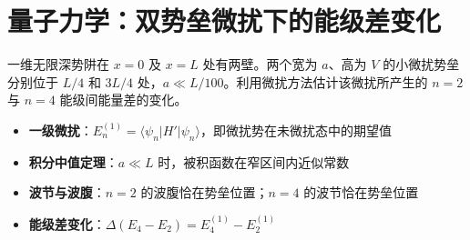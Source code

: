 \section{量子力学：双势垒微扰下的能级差变化}
\label{sec:double-barrier-perturbation}

\begin{modelbox}[题目：双势垒微扰下的能级差变化]
一维无限深势阱在 $x=0$ 及 $x=L$ 处有两壁。两个宽为 $a$、高为 $V$ 的小微扰势垒分别位于 $L/4$ 和 $3L/4$ 处，$a\ll L/100$。利用微扰方法估计该微扰所产生的 $n=2$ 与 $n=4$ 能级间能量差的变化。
\end{modelbox}

\begin{tipbox}[考点快速分析]
\begin{itemize}
    \item \textbf{一级微扰}：$E_n^{(1)}=\langle\psi_n|H'|\psi_n\rangle$，即微扰势在未微扰态中的期望值
    \item \textbf{积分中值定理}：$a\ll L$ 时，被积函数在窄区间内近似常数
    \item \textbf{波节与波腹}：$n=2$ 的波腹恰在势垒位置；$n=4$ 的波节恰在势垒位置
    \item \textbf{能级差变化}：$\Delta(E_4-E_2)=E_4^{(1)}-E_2^{(1)}$
\end{itemize}
\end{tipbox}

